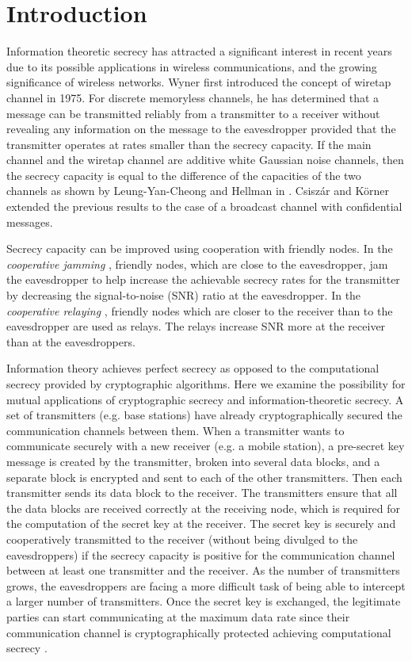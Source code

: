 \documentclass[conference,a4paper]{IEEEtran}
\begin{document}
\section{Introduction}
Information theoretic secrecy has attracted a significant  interest in recent years due to its possible applications in wireless communications,
and the growing significance of wireless networks.
Wyner \cite{Wyner:1975} first introduced the concept of wiretap channel in 1975.
For discrete memoryless channels, he has determined that a message can be transmitted reliably from a
transmitter to a receiver without revealing any information on the message to the eavesdropper
provided that the transmitter operates at rates smaller than the secrecy capacity.
If the main channel and the wiretap channel are additive white Gaussian noise channels, 
then the secrecy capacity is equal to the difference of the capacities of the two channels as shown by 
Leung-Yan-Cheong and Hellman in \cite{Hellman:1978}.
Csisz{\'a}r and K{\"o}rner \cite{Csiszar-Korner78} extended the previous results to the case of a broadcast channel with confidential
messages.

Secrecy capacity can be improved using cooperation with friendly nodes.
In the {\em cooperative jamming} \cite{Tekin_Yener_2007}, friendly nodes, which are close to the eavesdropper, 
jam the eavesdropper to help increase the achievable secrecy rates for the transmitter
by decreasing the signal-to-noise (SNR) ratio at the eavesdropper.
In the {\em cooperative relaying} \cite{Lai-ElGamal2008, MarinaBH09}, friendly nodes which are closer to the receiver than to the eavesdropper are used as relays.
The relays increase SNR more at the receiver than at the eavesdroppers.



Information theory achieves perfect secrecy as opposed to the computational secrecy provided by cryptographic algorithms.
Here we examine the possibility for mutual applications of cryptographic secrecy and information-theoretic secrecy.
A set of transmitters (e.g. base stations) have already cryptographically secured the communication channels  between them.
When a transmitter wants to communicate securely with a new receiver (e.g. a mobile station),
a pre-secret key message is created by the transmitter, broken into several data blocks, and a separate block is encrypted and sent to each of the other transmitters.
Then each transmitter sends its data block to the receiver.
The transmitters ensure that all the data blocks are received correctly at the receiving node, which is required for the computation of the secret key at the receiver.
The secret key is securely and cooperatively transmitted to the receiver (without being divulged to the eavesdroppers) if the secrecy capacity is positive for the communication channel between at least one transmitter and the receiver.
As the number of transmitters grows, the eavesdroppers are facing a more difficult task of being able to intercept a larger number of transmitters.
Once the secret key is exchanged, the legitimate parties can start communicating at the maximum data rate since their
communication channel is cryptographically protected achieving computational secrecy \cite{Shannon1949}.
\end{document}
